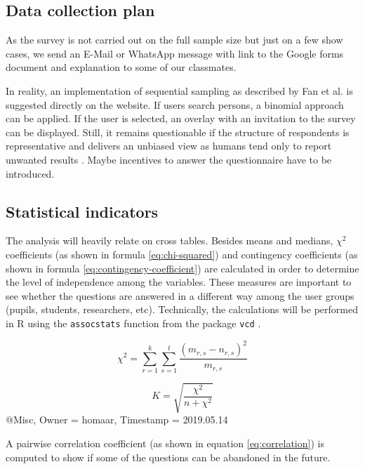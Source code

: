 \documentclass[12pt,a4paper,paper=a4,oneside,titlepage,pdftex]{scrartcl}
\begin{document}
\subsection{Data collection plan}
As the survey is not carried out on the full sample size but just on a few show cases, we send an E-Mail or WhatsApp message with link to the Google forms document and explanation to some of our classmates.

In reality, an implementation of sequential sampling as described by Fan et al. \citep{fan1962development} is suggested directly on the website. If users search persons, a binomial approach can be applied. If the user is selected, an overlay with an invitation to the survey can be displayed. Still, it remains questionable if the structure of respondents is representative and delivers an unbiased view as humans tend only to report unwanted results \citep{bergstrand1983bias}. Maybe incentives to answer the questionnaire have to be introduced.

\subsection{Statistical indicators}
The analysis will heavily relate on cross tables. Besides means and medians, $\chi^2$ coefficients \citep{doi:10.1080/14786440009463897} (as shown in formula \ref{eq:chi-squared}) and contingency coefficients \citep{pearson1930theory} (as shown in formula \ref{eq:contingency-coefficient}) are calculated in order to determine the level of independence among the variables. These measures are important to see whether the questions are answered in a different way among the user groups (pupils, students, researchers, etc). Technically, the calculations will be performed in R using the \verb|assocstats| function from the package \verb|vcd| \citep{vcd2006}.

\begin{equation}
\chi^2 = \sum_{r=1}^{k}\sum_{s=1}^{t}\frac{(m_{r,s}-n_{r,s})^2}{m_{r,s}}
\label{eq:chi-squared}
\end{equation}

\begin{equation}
K = \sqrt{\frac{\chi^2}{n+\chi^2}}
\label{eq:contingency-coefficient}
\end{equation}@Misc{,
  Owner                    = {homaar},
  Timestamp                = {2019.05.14}
}


A pairwise correlation coefficient \citep{lee1988thirteen} (as shown in equation \ref{eq:correlation}) is computed to show if some of the questions can be abandoned in the future.
\end{document}
